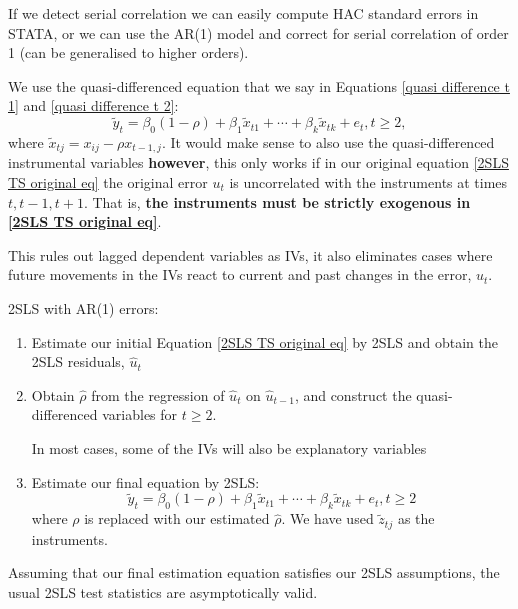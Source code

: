 \documentclass[11pt]{article}
\begin{document}
If we detect serial correlation we can easily compute HAC standard errors in STATA, or we can use the AR(1) model and correct for serial correlation of order 1 (can be generalised to higher orders).

We use the quasi-differenced equation that we say in Equations \eqref{quasi difference t 1} and \eqref{quasi difference t 2}:
\begin{equation}
\tilde{y}_t=\beta_0(1-\rho)+\beta_1 \widetilde{x}_{t 1}+\cdots+\beta_k \widetilde{x}_{t k}+e_t, t \geq 2,
\end{equation}
where $\tilde{x}_{tj} = x_{ij} - \rho x_{t-1,j}$. It would make sense to also use the quasi-differenced instrumental variables \textbf{however}, this only works if in our original equation \eqref{2SLS TS original eq} the original error $u_t$ is uncorrelated with the instruments at times $t, t-1, t+1$. That is, \textbf{the instruments must be strictly exogenous in \eqref{2SLS TS original eq}}. 

This rules out lagged dependent variables as IVs, it also eliminates cases where future movements in the IVs react to current and past changes in the error, $u_t$.

\begin{procedure}
    2SLS with AR(1) errors:
    \begin{enumerate}
        \item Estimate our initial Equation \eqref{2SLS TS original eq} by 2SLS and obtain the 2SLS residuals, $\hat{u}_{t}$
        \item Obtain $\hat{\rho}$ from the regression of $\hat{u}_t$ on $\hat{u}_{t-1}$, and construct the quasi-differenced variables for $t\geq2$. 
        \begin{note}
            In most cases, some of the IVs will also be explanatory variables
        \end{note}
        \item Estimate our final equation by 2SLS:
        \begin{equation}
            \tilde{y}_t=\beta_0(1-\rho)+\beta_1 \tilde{x}_{t 1}+\cdots+\beta_k \widetilde{x}_{t k}+e_t, t \geq 2
        \end{equation}
        where $\rho$ is replaced with our estimated $\hat{\rho}$. We have used $\tilde{z}_{tj}$ as the instruments.
        \end{enumerate}

        Assuming that our final estimation equation satisfies our 2SLS assumptions, the usual 2SLS test statistics are asymptotically valid.
\end{procedure}
\end{document}
